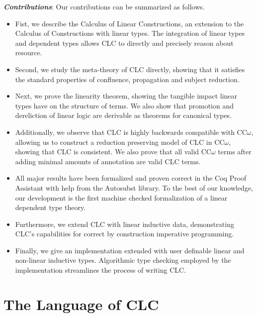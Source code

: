 \documentclass[sigplan,screen]{acmart}
\theoremstyle{definition}
\begin{document}
  \noindent \textbf{\textit{Contributions}}: 
  Our contributions can be summarized as follows.
  \begin{itemize}
    \item Fist, we describe the Calculus of Linear Constructions, an extension to the Calculus of Constructions with linear types. The integration of linear types and dependent types allows CLC to directly and precisely reason about resource.
    \item Second, we study the meta-theory of CLC directly, showing that it satisfies the standard properties of confluence, propagation and subject reduction.
    \item Next, we prove the linearity theorem, showing the tangible impact linear types have on the structure of terms. We also show that promotion and dereliction of linear logic are derivable as theorems for canonical types.
    \item Additionally, we observe that CLC is highly backwards compatible with CC$\omega$, allowing us to construct a reduction preserving model of CLC in CC$\omega$, showing that CLC is consistent. We also prove that all valid CC$\omega$ terms after adding minimal amounts of annotation are valid CLC terms.
    \item All major results have been formalized and proven correct in the Coq Proof Assistant with help from the Autosubst \cite{autosubst} library. To the best of our knowledge, our development is the first machine checked formalization of a linear dependent type theory.
    \item Furthermore, we extend CLC with linear inductive data, demonstrating CLC's capabilities for correct by construction imperative programming.
    \item Finally, we give an implementation extended with user definable linear and non-linear inductive types. Algorithmic type checking employed by the implementation streamlines the process of writing CLC.
  \end{itemize}

  \section{The Language of CLC}
\end{document}
